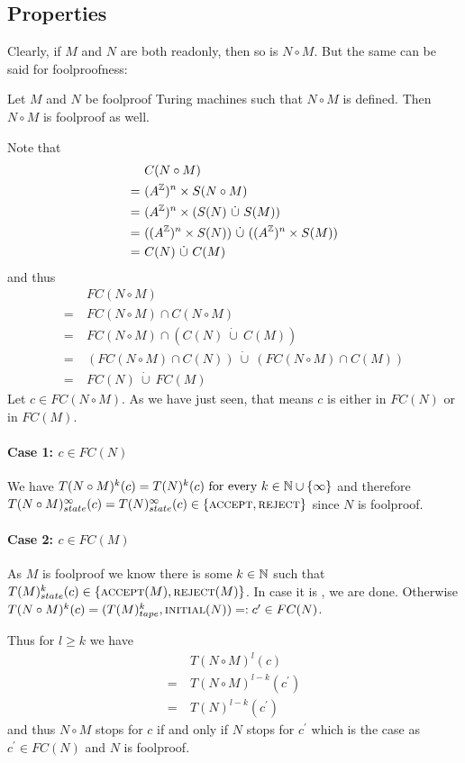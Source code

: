 \subsection{Properties}

Clearly, if $M$ and $N$ are both readonly, then so is $N \circ M$. But the same can be said for foolproofness:

\begin{Lemma} \label{turing_machines:lemma_foolproof_concatenation:lemma}
	Let $M$ and $N$ be foolproof Turing machines such that $N \circ M$ is defined. Then $N \circ M$ is foolproof as well.
\end{Lemma}
\proof
Note that
\begin{align*}
	&C(N \circ M) \\
	=~&(A^{\mathbb{Z}})^n \times S(N \circ M) \\
	=~&(A^{\mathbb{Z}})^n \times (S(N)~\dot\cup~S(M)) \\
	=~&((A^{\mathbb{Z}})^n \times S(N))~\dot\cup~((A^{\mathbb{Z}})^n \times S(M)) \\
	=~&C(N)~\dot\cup~C(M)
\end{align*}
and thus
\begin{align*}
	&FC(N \circ M) \\
	=~&FC(N \circ M) \cap C(N \circ M) \\
	=~&FC(N \circ M) \cap (C(N)~\dot\cup~C(M)) \\
	=~&(FC(N \circ M) \cap C(N))~\dot\cup~(FC(N \circ M) \cap C(M)) \\
	=~&FC(N)~\dot\cup~FC(M)
\end{align*}
Let $c \in FC(N \circ M)$. As we have just seen, that means $c$ is either in $FC(N)$ or in $FC(M)$.
\paragraph{Case 1: $c \in FC(N)$}
We have
$T(N \circ M)^k (c) = T(N)^k (c) ~\text{for every}~ k \in \mathbb{N} \cup \{\infty\}$
and therefore $T(N \circ M)_{state}^\infty(c) = T(N)_{state}^\infty(c) \in \{\text{\scshape{accept}},\text{\scshape{reject}}\}$
since $N$ is foolproof.
\paragraph{Case 2: $c \in FC(M)$}
As $M$ is foolproof we know there is some $k \in \mathbb{N}$ such that $T(M)_{state}^k(c) \in \{\text{\scshape{accept}}(M),\text{\scshape{reject}}(M)\}$.
In case it is \REJ, we are done.
Otherwise $T(N \circ M)^k(c) = (T(M)_{tape}^k,\text{\scshape{initial}}(N)) =: c^\prime \in FC(N)$.

Thus for $l \geq k$ we have
\begin{align*}
	&T(N \circ M)^l(c) \\
	=~&T(N \circ M)^{l-k}(c^\prime) \\
	=~&T(N)^{l-k}(c^\prime)
\end{align*}
and thus $N \circ M$ stops for $c$ if and only if $N$ stops for $c^\prime$ which is the case as $c^\prime \in FC(N)$ and $N$ is foolproof.
\endproof
